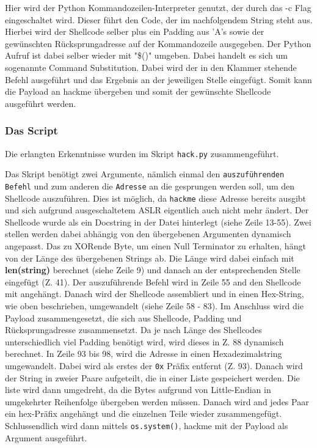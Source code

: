 \documentclass[12pt]{article}
\begin{document}
Hier wird der Python Kommandozeilen-Interpreter genutzt, der durch das -c Flag eingeschaltet wird. Dieser führt den Code, der im nachfolgendem String steht aus. Hierbei wird der Shellcode selber plus ein Padding aus 'A's sowie der gewünschten Rücksprungadresse auf der Kommandozeile ausgegeben. Der Python Aufruf ist dabei selber wieder mit "\$()" umgeben. Dabei handelt es sich um sogenannte Command Substitution. Dabei wird der in den Klammer stehende Befehl ausgeführt und das Ergebnis an der jeweiligen Stelle eingefügt. Somit kann die Payload an hackme übergeben und somit der gewünschte Shellcode ausgeführt werden. 

\subsubsection{Das Script}
Die erlangten Erkenntnisse wurden im Skript \texttt{hack.py} zusammengeführt.



Das Skript benötigt zwei Argumente, nämlich einmal den \texttt{auszuführenden Befehl} und zum anderen die \texttt{Adresse} an die gesprungen werden soll, um den Shellcode auszuführen. Dies ist möglich, da \texttt{hackme} diese Adresse bereits ausgibt und sich aufgrund ausgeschaltetem ASLR eigentlich auch nicht mehr ändert.
\newline
Der Shellcode wurde als ein Docstring in der Datei hinterlegt (siehe Zeile 13-55). Zwei stellen werden dabei abhängig von den übergebenen Argumenten dynamisch angepasst. Das zu XORende Byte, um einen Null Terminator zu erhalten, hängt von der Länge des übergebenen Strings ab. Die Länge wird dabei einfach mit \textbf{len(string)} berechnet (siehe Zeile 9) und danach an der entsprechenden Stelle eingefügt (Z. 41).
\newline
Der auszuführende Befehl wird in Zeile 55 and den Shellcode mit angehängt.
\newline
Danach wird der Shellcode assembliert und in einen Hex-String, wie oben beschrieben, umgewandelt (siehe Zeile 58 - 83).
\newline
Im Anschluss wird die Payload zusammengesetzt, die sich aus Shellcode, Padding und Rücksprungadresse zusammensetzt. Da je nach Länge des Shellcodes unterschiedlich viel Padding benötigt wird, wird dieses in Z. 88 dynamisch berechnet.
\newline
In Zeile 93 bis 98, wird die Adresse in einen Hexadezimalstring umgewandelt. Dabei wird als erstes der \texttt{0x} Präfix entfernt (Z. 93). Danach wird der String in zweier Paare aufgeteilt, die in einer Liste gespeichert werden. Die liste wird dann umgedreht, da die Bytes aufgrund von Little-Endian in umgekehrter Reihenfolge übergeben werden müssen. Danach wird and jedes Paar ein hex-Präfix angehängt und die einzelnen Teile wieder zusammengefügt.
\newline
Schlussendlich wird dann mittels \texttt{os.system()}, hackme mit der Payload als Argument ausgeführt.
\end{document}
